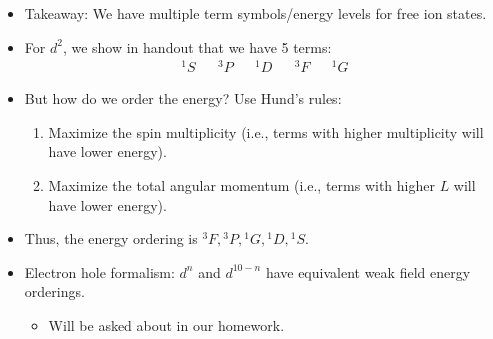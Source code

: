 \documentclass[../notes.tex]{subfiles}
\begin{document}
\begin{itemize}
\begin{itemize}
    \end{itemize}
    \item Takeaway: We have multiple term symbols/energy levels for free ion states.
    \item For $d^2$, we show in handout that we have 5 terms:
    \begin{align*}
        {}^1S&&
        {}^3P&&
        {}^1D&&
        {}^3F&&
        {}^1G
    \end{align*}
    \item But how do we order the energy? Use Hund's rules:
    \begin{enumerate}
        \item Maximize the spin multiplicity (i.e., terms with higher multiplicity will have lower energy).
        \item Maximize the total angular momentum (i.e., terms with higher $L$ will have lower energy).
    \end{enumerate}
    \item Thus, the energy ordering is ${}^3F,{}^3P,{}^1G,{}^1D,{}^1S$.
    \item Electron hole formalism: $d^n$ and $d^{10-n}$ have equivalent weak field energy orderings.
    \begin{itemize}
        \item Will be asked about in our homework.
    \end{itemize}
\end{itemize}
\end{document}
